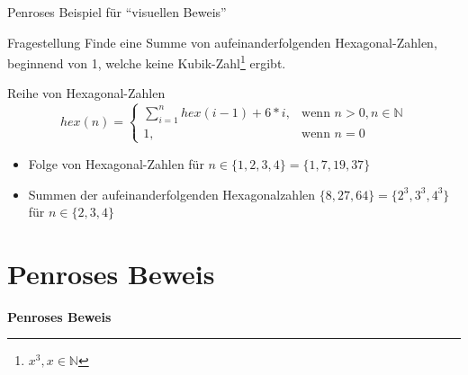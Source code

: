 \begin{frame}{Penroses Beispiel für \enquote{visuellen Beweis}}
\label{sec:visual_proof}
    \begin{block}{Fragestellung}
        Finde eine Summe von aufeinanderfolgenden Hexagonal-Zahlen, beginnend von 1, welche keine Kubik-Zahl\footnote{$x^3, x \in \mathbb{N}$} ergibt.
    \end{block}
    \begin{block}{Reihe von Hexagonal-Zahlen}
        \[
            hex(n) =
            \begin{cases}
                \sum_{i=1}^{n} hex(i-1) + 6*i ,     & \text{wenn } n > 0, n \in \mathbb{N}\\
                1                             ,     & \text{wenn } n = 0
            \end{cases}
        \]
    \end{block}
\end{frame}

\begin{frame}
\begin{itemize}
    \item Folge von Hexagonal-Zahlen für $ n \in \{1, 2, 3, 4\} = \{1, 7, 19, 37\}$
    \item Summen der aufeinanderfolgenden Hexagonalzahlen $\{ 8, 27, 64\} = \{ 2^3, 3^3, 4^3\}$ für $n \in \{2, 3, 4\}$
\end{itemize}
\end{frame}

\section{Penroses Beweis}
\label{sec:penroses_proof}

\begin{frame}
    \vspace*{\fill}
        \begin{center}
            \Huge \textbf{Penroses Beweis}
        \end{center}
    \vspace*{\fill}
\end{frame}

